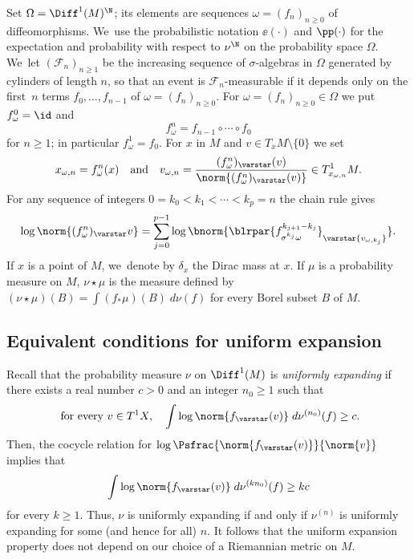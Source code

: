 Set $\Omega=\Diff^1(M)^\N$; its elements
are sequences $\omega = (f_n)_{n\geq 0}$ of diffeomorphisms. We~use the
probabilistic notation $\ee(\cdot)$ and $\pp(\cdot)$ for the expectation and probability with respect to $\nu^\N$
on the probability space $\Omega$. We~let
$(\mathcal F_n)_{n\geq 1}$ be the increasing sequence of $\sigma$-algebras in $\Omega$
generated by cylinders of length $n$, so that an event is $\mathcal F_n$-measurable if it depends only on
the first~$n$ terms $f_0, \ldots , f_{n-1}$ of $\omega=(f_n)_{n\geq 0}$.
For $\omega = (f_n)_{n\geq 0} \in \Omega$ we put $f^0_\omega=\id$ and
\begin{equation*}
f_\omega^n = f_{n-1}\circ \cdots \circ f_0
\end{equation*}
for $n\geq 1$; in particular $f_\omega^1 = f_0$. For $x$ in $M$ and $ v \in T_xM\setminus\{ 0\}$ we set
\begin{equation*}
x_{\omega, n} = f_\omega^n(x) \quad {\text{and}} \quad
v_{\omega, n} = \frac{ (f_\omega^n)_\varstar (v)} {\norm{ (f_\omega^n)_\varstar (v)}}\in T^1_{x_{\omega, n}}M.
\end{equation*}
For any sequence of integers
$0= k_0< k_1< \cdots < k_p = n$ the chain rule gives
\begin{equation}\label{eq:chain_rule}
\log\norm{(f_\omega^n)_\varstar v} = \sum_{j=0}^{p-1} \log \bnorm{ \blrpar{f^{k_{j+1}- k_j}_{\sigma^{k_j}\omega}}_\varstar { v_{\omega, k_j}}} .
\end{equation}
If $x$ is a point of $M$, we~denote by $\delta_x$ the Dirac mass at $x$. If $\mu$ is a probability measure on $M$, $\nu\star\mu$
is the measure defined by $(\nu\star\mu)(B)=\int (f_*\mu)(B) \; d\nu(f)$ for every Borel subset $B$ of $M$.

\subsection{Equivalent conditions for uniform expansion}

Recall that the probability measure $\nu$ on $\Diff^1(M)$ is \emph{uniformly expanding}
if there exists a real number $c>0$ and an integer $n_0\geq 1$ such that
\begin{equation}\label{eq:UEbisrepetita}
\text{ for every } v\in T^1X, \quad
\int \log {\norm{ f_\varstar ( v)}} \; d\nu^{(n_0)} (f) \geq c.
\end{equation}
Then, the cocycle relation for
$ \log \Psfrac{\norm{ f_\varstar ( v)}}{\norm{ v}}$ implies that
\begin{equation}\label{eq:UE_iteree}
\int \log {\norm{ f_\varstar ( v)}} \; d\nu^{(kn_0)}(f) \geq kc
\end{equation}
for every $k\geq 1$. Thus, $\nu$ is uniformly expanding if and only if
$\nu^{(n)}$ is uniformly expanding for some (and hence for all) $n$. It follows that the uniform expansion property
does not depend on our choice of a Riemannian metric on $M$.

